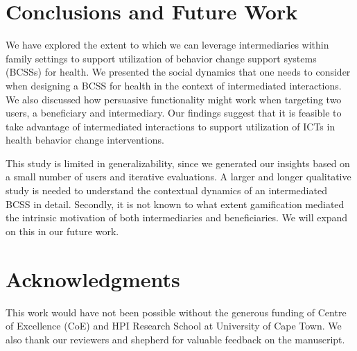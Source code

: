 \documentclass{sig-alternate}
\begin{document}
\section{Conclusions and Future Work}

We have explored the extent to which we can leverage intermediaries within
family settings to support utilization of behavior change support
systems (BCSSs) for health. We presented the social dynamics that one needs to
consider when designing a BCSS for health in the context of intermediated
interactions. We also discussed how persuasive functionality might work
when targeting two users, a beneficiary and intermediary. 
Our findings
suggest that it is feasible to take advantage of intermediated interactions to
support utilization of ICTs in health behavior change interventions.
   
This study is limited in generalizability, since we generated our insights
based on a small number of users and iterative evaluations. 
A larger and longer qualitative study is needed
to understand the contextual dynamics of an intermediated BCSS in detail.
Secondly, it is not known to what extent gamification mediated the intrinsic motivation of both intermediaries and beneficiaries. We will expand on this in our future work.



\section{Acknowledgments} 

This work would have
not been possible without the generous funding of Centre of Excellence (CoE)
and HPI Research School at University of Cape Town.  We also thank our reviewers
and shepherd for valuable feedback on the manuscript.

%

%
%
\end{document}
